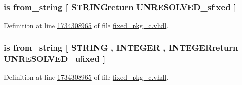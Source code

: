 \hypertarget{classfixed__pkg_a8565828ee8a865ed84907517f2e56ed5}{}
\subsubsection[{from\+\_\+bstring}]{ {\bfseries \textcolor{keywordflow}{is}\textcolor{vhdlchar}{ }\textcolor{vhdlchar}{from\+\_\+string}\textcolor{vhdlchar}{ }\textcolor{vhdlchar}{\mbox{[}}\textcolor{vhdlchar}{ }\textcolor{vhdlchar}{S\+T\+R\+I\+N\+Greturn}\textcolor{vhdlchar}{ }{\bfseries {\bf U\+N\+R\+E\+S\+O\+L\+V\+E\+D\+\_\+sfixed}} \textcolor{vhdlchar}{ }\textcolor{vhdlchar}{\mbox{]}}\textcolor{vhdlchar}{ }} \hspace{0.3cm}{\ttfamily [Alias]}}\label{classfixed__pkg_a8565828ee8a865ed84907517f2e56ed5}


Definition at line \hyperlink{fixed__pkg__c_8vhdl_source_l1734308965}{1734308965} of file \hyperlink{fixed__pkg__c_8vhdl_source}{fixed\+\_\+pkg\+\_\+c.\+vhdl}.

\hypertarget{classfixed__pkg_a17bc15f81efcdd1628221ee9a0cb09d9}{}
\subsubsection[{from\+\_\+bstring}]{ {\bfseries \textcolor{keywordflow}{is}\textcolor{vhdlchar}{ }\textcolor{vhdlchar}{from\+\_\+string}\textcolor{vhdlchar}{ }\textcolor{vhdlchar}{\mbox{[}}\textcolor{vhdlchar}{ }\textcolor{comment}{S\+T\+R\+I\+N\+G}\textcolor{vhdlchar}{ }\textcolor{vhdlchar}{,}\textcolor{vhdlchar}{ }\textcolor{comment}{I\+N\+T\+E\+G\+E\+R}\textcolor{vhdlchar}{ }\textcolor{vhdlchar}{,}\textcolor{vhdlchar}{ }\textcolor{vhdlchar}{I\+N\+T\+E\+G\+E\+Rreturn}\textcolor{vhdlchar}{ }{\bfseries {\bf U\+N\+R\+E\+S\+O\+L\+V\+E\+D\+\_\+ufixed}} \textcolor{vhdlchar}{ }\textcolor{vhdlchar}{\mbox{]}}\textcolor{vhdlchar}{ }} \hspace{0.3cm}{\ttfamily [Alias]}}\label{classfixed__pkg_a17bc15f81efcdd1628221ee9a0cb09d9}


Definition at line \hyperlink{fixed__pkg__c_8vhdl_source_l1734308965}{1734308965} of file \hyperlink{fixed__pkg__c_8vhdl_source}{fixed\+\_\+pkg\+\_\+c.\+vhdl}.

